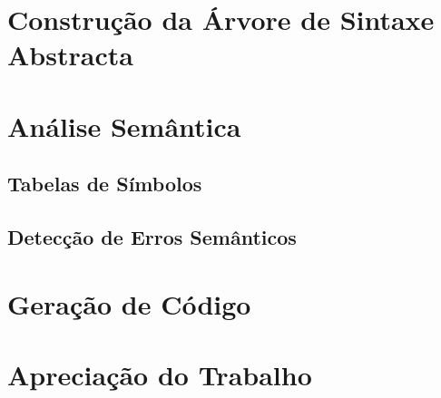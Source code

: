 \documentclass[11pt,a4paper]{article}
\begin{document}
\pagebreak

\section{Construção da Árvore de Sintaxe Abstracta}

\pagebreak

\section{Análise Semântica}

	\subsection{Tabelas de Símbolos}
	
\pagebreak
	
	\subsection{Detecção de Erros Semânticos}
	
\pagebreak
	
\section{Geração de Código}

\pagebreak

\section{Apreciação do Trabalho}
\end{document}
